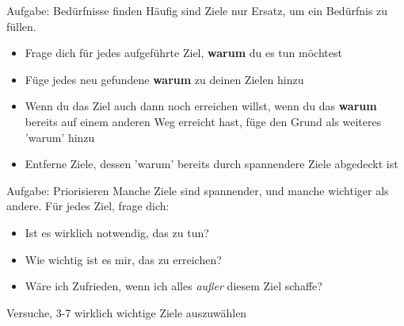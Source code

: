 \begin{frame}[c]
    \normalsize
    \begin{block}{Aufgabe: Bedürfnisse finden}
    Häufig sind Ziele nur Ersatz, um ein Bedürfnis zu füllen.
    \begin{itemize}
        \item Frage dich für jedes aufgeführte Ziel, \textbf{warum} du es tun möchtest
        \item Füge jedes neu gefundene \textbf{warum} zu deinen Zielen hinzu
        \item Wenn du das Ziel auch dann noch erreichen willst, wenn du das
            \textbf{warum} bereits auf einem anderen Weg erreicht hast, füge
            den Grund als weiteres 'warum' hinzu
        \item Entferne Ziele, dessen 'warum' bereits durch spannendere Ziele abgedeckt ist
    \end{itemize}
    \end{block}
\end{frame}


\begin{frame}[c]
    \begin{block}{Aufgabe: Priorisieren}
    Manche Ziele sind spannender, und manche wichtiger als andere. Für jedes
    Ziel, frage dich:
    \begin{itemize}
        \item Ist es wirklich notwendig, das zu tun?
        \item Wie wichtig ist es mir, das zu erreichen?
        \item Wäre ich Zufrieden, wenn ich alles {\em außer} diesem Ziel schaffe?
    \end{itemize} \pause
    Versuche, 3-7 wirklich wichtige Ziele auszuwählen
    \end{block}
\end{frame}
